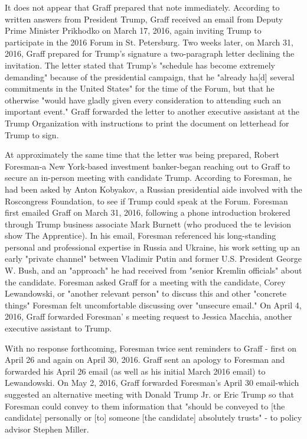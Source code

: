 It does not appear that Graff prepared that note immediately.
According to written answers from President Trump,%
Graff received an email from Deputy Prime Minister Prikhodko on March 17, 2016, again inviting Trump to participate in the 2016 Forum in St. Petersburg.%
Two weeks later, on March 31, 2016, Graff prepared for Trump's signature a two-paragraph letter declining the invitation.%
The letter stated that Trump's "schedule has become extremely demanding" because of the presidential campaign, that he "already ha[d] several commitments in the United States" for the time of the Forum, but that he otherwise "would have gladly given every consideration to attending such an important event."%
Graff forwarded the letter to another executive assistant at the Trump Organization with instructions to print the document on letterhead for Trump to sign.%

At approximately the same time that the letter was being prepared, Robert Foresman-a New York-based investment banker-began reaching out to Graff to secure an in-person meeting with candidate Trump.
According to Foresman, he had been asked by Anton Kobyakov, a Russian presidential aide involved with the Roscongress Foundation, to see if Trump could speak at the Forum.%
Foresman first emailed Graff on March 31, 2016, following a phone introduction brokered through Trump business associate Mark Burnett (who produced the te levision show The Apprentice).
In his email, Foresman referenced his long-standing personal and professional expertise in Russia and Ukraine, his work setting up an early "private channel" between Vladimir Putin and former U.S. President George W. Bush, and an "approach" he had received from "senior Kremlin officials" about the candidate.
Foresman asked Graff for a meeting with the candidate, Corey Lewandowski, or "another relevant person" to discuss this and other "concrete things" Foresman felt uncomfortable discussing over "unsecure email."%
On April 4, 2016, Graff forwarded Foresman' s meeting request to Jessica Macchia, another executive assistant to Trump.%

With no response forthcoming, Foresman twice sent reminders to Graff - first on April 26 and again on April 30, 2016.%
Graff sent an apology to Foresman and forwarded his April 26 email (as well as his initial March 2016 email) to Lewandowski.%
On May 2, 2016, Graff forwarded Foresman's April 30 email-which suggested an alternative meeting with Donald Trump Jr. or Eric Trump so that Foresman could convey to them information that "should be conveyed to [the candidate] personally or [to] someone [the candidate] absolutely trusts" - to policy advisor Stephen Miller.%

